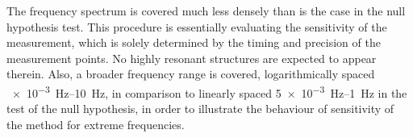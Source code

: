 The frequency spectrum is covered much less densely than is the case in the null hypothesis test. This procedure is essentially evaluating the sensitivity of the measurement, which is solely determined by the timing and precision of the measurement points. No highly resonant structures are expected to appear therein. Also, a broader frequency range is covered, logarithmically spaced \SIrange[range-phrase=--,range-units=single]{e-3}{10}{\hertz}, in comparison to linearly spaced \SIrange[range-phrase=--,range-units=single]{5e-3}{1}{\hertz} in the test of the null hypothesis, in order to illustrate the behaviour of sensitivity of the method for extreme frequencies.



